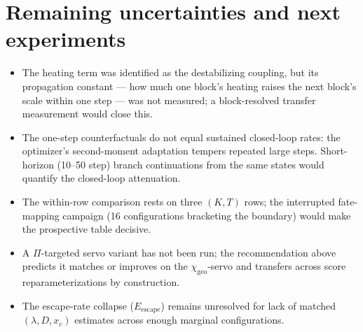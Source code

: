 \documentclass[11pt,a4paper]{article}
\newcommand{\chigeo}{\chi_{\mathrm{geo}}}
\newcommand{\Pisurr}{\Pi}
\begin{document}
\section{Remaining uncertainties and next experiments}

\begin{itemize}[leftmargin=1.4em]
\item The heating term was identified as the destabilizing coupling, but
its propagation constant --- how much one block's heating raises the next
block's scale within one step --- was not measured; a block-resolved
transfer measurement would close this.
\item The one-step counterfactuals do not equal sustained closed-loop
rates: the optimizer's second-moment adaptation tempers repeated large
steps. Short-horizon (10--50 step) branch continuations from the same
states would quantify the closed-loop attenuation.
\item The within-row comparison rests on three \((K,T)\) rows; the
interrupted fate-mapping campaign (16 configurations bracketing the
boundary) would make the prospective table decisive.
\item A \(\Pisurr\)-targeted servo variant has not been run; the
recommendation above predicts it matches or improves on the
\(\chigeo\)-servo and transfers across score reparameterizations by
construction.
\item The escape-rate collapse (\(E_{\mathrm{escape}}\)) remains
unresolved for lack of matched \((\lambda, D, x_c)\) estimates across
enough marginal configurations.
\end{itemize}
\end{document}
